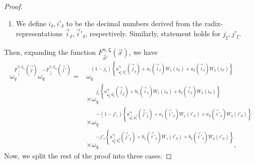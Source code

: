 \documentclass[10pt,a4paper]{amsart}
\theoremstyle{plain}
\begin{document}
\begin{proof}
\begin{enumerate}
			\item We define $i_{\delta}, i'_{\delta}$ to be the decimal numbers derived from the radix-representations $\vec{i}_{\delta}, \vec{i}'_{\delta}$, respectively. Similarly, statement holds for $j_{\xi}, j'_{\xi}$.
		\end{enumerate}
		Then, expanding the function $ F_{ \vec{d}'}^{\bm{\gamma}, \bm{\zeta}} (\vec{x})$, we have
		\begin{equation}\label{Thm_4_omega_eqn_1}
			\begin{split}
				\omega_q^{ F_{ \vec{i}}^{\bm{\gamma}, \bm{\zeta}_1} (\vec{j}) } \omega_q^{ -F_{ \vec{i}'}^{\bm{\gamma}, \bm{\zeta}_2} (\vec{j}') }
				=& \omega_q^{ (1-j_{\epsilon}) \left\{a_{\mathbf{s}_1^1,\mathbf{t}_1^1}^{\bm{\gamma}} (\vec{j}_{\xi}) + a_1(\vec{i}_{\delta}) W_1(i_\vartheta) + a_2(\vec{i}_{\delta}) W_2(i_\vartheta) \right\}} \\
				&  \times \omega_q^{ j_{\epsilon} \left\{a_{\mathbf{s}_2^1,\mathbf{t}_2^1}^{\bm{\gamma}} (\vec{j}_{\xi}) + b_1(\vec{i}_{\delta}) W_1(i_\vartheta) + b_2(\vec{i}_{\delta}) W_2(i_\vartheta)\right\}} \\
				& \times \omega_q^{ -(1-j'_{\epsilon}) \left\{a_{\mathbf{s}_1^2,\mathbf{t}_1^2}^{\bm{\gamma}} (\vec{j}'_{\xi}) + a_1(\vec{i}'_{\delta}) W_1(i'_\vartheta) + a_2(\vec{i}'_{\delta}) W_2(i'_\vartheta)\right\}} \\
				& \times \omega_q^{ -j'_{\epsilon} \left\{a_{\mathbf{s}_2^2,\mathbf{t}_2^2}^{\bm{\gamma}} (\vec{j}'_{\xi}) + b_1(\vec{i}'_{\delta}) W_1(i'_\vartheta) + b_2(\vec{i}'_{\delta}) W_2(i'_\vartheta)\right\}},
			\end{split}
		\end{equation}
		Now, we split the rest of the proof into three cases.
		

\end{proof}
\end{document}
